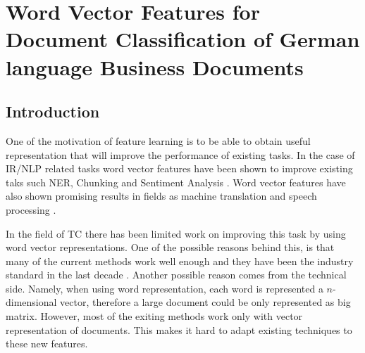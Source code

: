 \chapter{Word Vector Features  for Document Classification of German language Business Documents}
\label{chap:rel_word2vec_doc_classification}




\section{Introduction}
\label{sec:w2v4tc_intro}

One of the motivation of feature learning is to be able to
obtain useful representation that will improve the performance of  existing tasks. In the case of
\ac{IR}/\ac{NLP} related tasks  word vector features have been shown to
improve existing taks such \ac{NER}, Chunking and Sentiment Analysis
\cite{Turian:2010:WRS:1858681.1858721}
\cite{DBLP:journals/corr/abs-1103-0398}. Word vector features have also shown
promising results in fields as machine translation and speech processing \cite{collobert:2008}
\cite{DBLP:journals/corr/MikolovLS13}.  

In the field of \ac{TC}  there has been  limited work on improving  this
task by using word vector representations. One of the  possible reasons  behind this,
is that many of the current  methods work well enough and they have been the industry standard in the last decade \cite{Sebastiani02} . Another possible reason comes from the
technical side. Namely, when using word representation, each word is represented a $n$-dimensional vector, therefore a large document could be only
represented as big matrix. However, most of the exiting methods work only with vector
representation of documents. This makes  it hard to adapt existing
techniques to these new features.  

